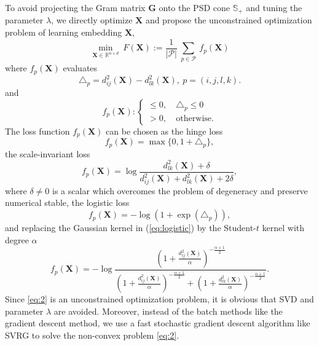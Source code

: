 \documentclass[letterpaper]{article} %
\begin{document}
To avoid projecting the Gram matrix $\mathbf{G}$ onto the PSD cone $\mathbb{S}_{+}$ and tuning the parameter $\lambda$, we directly optimize $\mathbf{X}$ and propose the unconstrained optimization problem of learning embedding $\mathbf{X}$,
\begin{equation}
	\label{eq:2}
	\underset{\mathbf{X}\in\mathbb{R}^{n\times d}}{\min}\ F(\mathbf{X}):=\frac{1}{|\mathcal{P}|}\ \underset{p\in\mathcal{P}}{\sum}\ f_p(\mathbf{X})
\end{equation}
where $f_p(\mathbf{X})$ evaluates
$$
	\triangle_p = d^2_{ij}(\mathbf{X})-d^2_{lk}(\mathbf{X}),\ p=(i,j,l,k).
$$
and
\begin{equation*}
	f_p(\mathbf{X}):
	\left\{
	\begin{matrix}
	\leq 0,\ & \triangle_p\leq 0\\
	> 0,\ & \text{otherwise.}
	\end{matrix}
	\right.
\end{equation*}
The loss function $f_p(\mathbf{X})$ can be chosen as the hinge loss \cite{agarwal2007generalized}
\begin{equation}
	\label{eq:hinge}
	f_p(\mathbf{X}) = \max\{0, 1+\triangle_p\},
\end{equation}
the scale-invariant loss \cite{tamuz2011adaptiive}
\begin{equation}
	\label{eq:scale-invariant}
	f_p(\mathbf{X}) = \log\frac{d^2_{lk}(\mathbf{X})+\delta}{d^2_{ij}(\mathbf{X})+d^2_{lk}(\mathbf{X})+2\delta},
\end{equation}
where $\delta\neq 0$ is a scalar which overcomes the problem of degeneracy and preserve numerical stable, the logistic loss \cite{vandermaaten2012stochastic}
\begin{equation}
	\label{eq:logistic}
	f_p(\mathbf{X}) = -\log(1+\exp(\triangle_p)),
\end{equation}
and replacing the Gaussian kernel in (\ref{eq:logistic}) by the Student-$t$ kernel with degree $\alpha$ \cite{vandermaaten2012stochastic}
\begin{equation}
	\label{eq:student}
	f_p(\mathbf{X}) = -\log\frac{\left(1+\frac{d^2_{ij}(\mathbf{X})}{\alpha}\right)^{-\frac{\alpha+1}{2}}}{\left(1+\frac{d^2_{ij}(\mathbf{X})}{\alpha}\right)^{-\frac{\alpha+1}{2}}+\left(1+\frac{d^2_{lk}(\mathbf{X})}{\alpha}\right)^{-\frac{\alpha+1}{2}}}.
\end{equation}
Since \eqref{eq:2} is an unconstrained optimization problem, it is obvious that SVD and parameter $\lambda$	are avoided. Moreover, instead of the batch methods like the gradient descent method, we use a fast stochastic gradient descent algorithm like SVRG to solve the non-convex problem \eqref{eq:2}.
\end{document}
